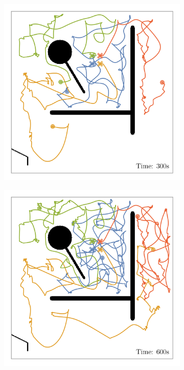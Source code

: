 \def\w{0.329\textwidth}
\begin{figure}[H]
    \centering
    \begin{subfigure}[b]{\w}
        \centering
        \includegraphics[width=\textwidth]{./figures/plots/gradient-paths/search:gradient-paths-(after-300s).png}
    \end{subfigure}
    \begin{subfigure}[b]{\w}
        \centering
        \includegraphics[width=\textwidth]{./figures/plots/gradient-paths/search:gradient-paths-(after-600s).png}

\end{subfigure}
\end{figure}
